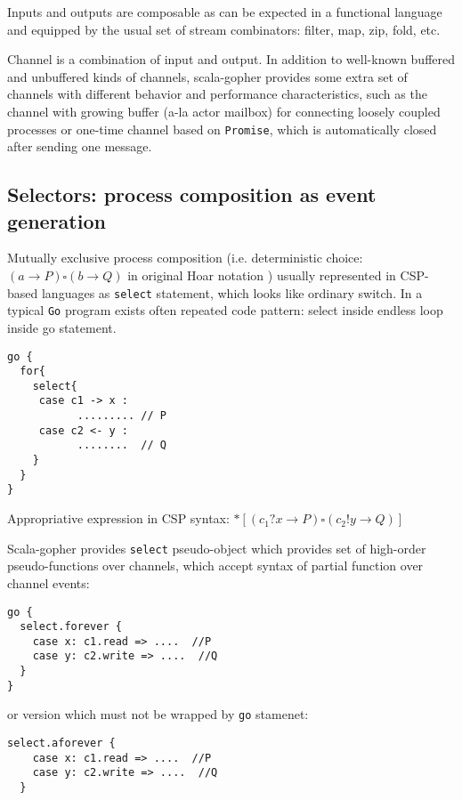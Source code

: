 \documentclass[12pt]{article}
\begin{document}
  Inputs and outputs are composable as can be expected in a functional language and equipped by 
the usual set of stream combinators: filter, map, zip, fold, etc.
 
  Channel is a combination of input and output. In addition to well-known buffered and unbuffered 
kinds of channels, scala-gopher provides some extra set of channels with different behavior and performance characteristics,
 such as the channel with growing buffer (a-la actor mailbox) for connecting loosely coupled processes or one-time channel based on \verb|Promise|, which is automatically closed after sending one message.

\subsection{Selectors: process composition as event generation}

 Mutually exclusive process composition (i.e. deterministic choice: $(a \to P)\square(b\to Q)$ in original Hoar notation )  usually represented in CSP-based languages as \verb|select| statement, which looks like ordinary switch. In a typical \verb|Go| program exists often repeated code pattern: select inside endless loop inside go statement.

\begin{Verbatim}[fontsize=\small]
go {
  for{
    select{
     case c1 -> x :
           ......... // P
     case c2 <- y :
           ........  // Q
    }
  }
}
\end{Verbatim}

  Appropriative expression in CSP syntax: $*[(c_{1} ? x \to P)\square(c_{2} ! y \to Q)]$

 Scala-gopher provides \verb|select| pseudo-object which provides set of high-order pseudo-functions over
channels, which accept syntax of partial function over channel events:

\begin{Verbatim}[fontsize=\small]
go {   
  select.forever {
    case x: c1.read => ....  //P
    case y: c2.write => ....  //Q
  }
}
\end{Verbatim}
   
  or version which must not be wrapped by \verb|go| stamenet:

\begin{Verbatim}[fontsize=\small]
  select.aforever {
    case x: c1.read => ....  //P
    case y: c2.write => ....  //Q
  }
\end{Verbatim}
   
\end{document}
